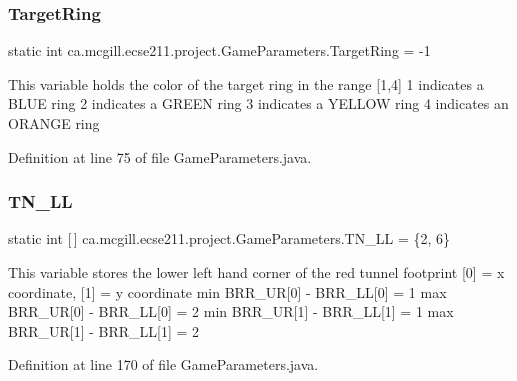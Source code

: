 \subsubsection{\texorpdfstring{Target\+Ring}{TargetRing}}
{\footnotesize\ttfamily  static  int ca.\+mcgill.\+ecse211.\+project.\+Game\+Parameters.\+Target\+Ring = -\/1\hspace{0.3cm}{\ttfamily [static]}}

This variable holds the color of the target ring in the range \mbox{[}1,4\mbox{]} 1 indicates a B\+L\+UE ring 2 indicates a G\+R\+E\+EN ring 3 indicates a Y\+E\+L\+L\+OW ring 4 indicates an O\+R\+A\+N\+GE ring 

Definition at line 75 of file Game\+Parameters.\+java.

\mbox{\label{enumca_1_1mcgill_1_1ecse211_1_1project_1_1_game_parameters_aff67c7474a260a8bcbb245a7c7d5b009}} 
\subsubsection{\texorpdfstring{T\+N\+\_\+\+LL}{TN\_LL}}
{\footnotesize\ttfamily  static  int \mbox{[}$\,$\mbox{]} ca.\+mcgill.\+ecse211.\+project.\+Game\+Parameters.\+T\+N\+\_\+\+LL = \{2, 6\}\hspace{0.3cm}{\ttfamily [static]}}

This variable stores the lower left hand corner of the red tunnel footprint \mbox{[}0\mbox{]} = x coordinate, \mbox{[}1\mbox{]} = y coordinate min B\+R\+R\+\_\+\+UR\mbox{[}0\mbox{]} -\/ B\+R\+R\+\_\+\+LL\mbox{[}0\mbox{]} = 1 max B\+R\+R\+\_\+\+UR\mbox{[}0\mbox{]} -\/ B\+R\+R\+\_\+\+LL\mbox{[}0\mbox{]} = 2 min B\+R\+R\+\_\+\+UR\mbox{[}1\mbox{]} -\/ B\+R\+R\+\_\+\+LL\mbox{[}1\mbox{]} = 1 max B\+R\+R\+\_\+\+UR\mbox{[}1\mbox{]} -\/ B\+R\+R\+\_\+\+LL\mbox{[}1\mbox{]} = 2 

Definition at line 170 of file Game\+Parameters.\+java.

\mbox{\label{enumca_1_1mcgill_1_1ecse211_1_1project_1_1_game_parameters_aa47abaface63a254570f9a82c4e1fe0d}} 
